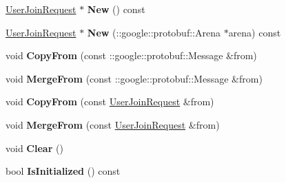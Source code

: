 \begin{DoxyCompactItemize}
\item 
\hypertarget{classSimpleChat_1_1UserJoinRequest_a0150a989e981f3fd7251433b40864a51}{\hyperlink{classSimpleChat_1_1UserJoinRequest}{User\-Join\-Request} $\ast$ {\bfseries New} () const }\label{classSimpleChat_1_1UserJoinRequest_a0150a989e981f3fd7251433b40864a51}

\item 
\hypertarget{classSimpleChat_1_1UserJoinRequest_abd14064bf5bfe987d71cb7ed385eed16}{\hyperlink{classSimpleChat_1_1UserJoinRequest}{User\-Join\-Request} $\ast$ {\bfseries New} (\-::google\-::protobuf\-::\-Arena $\ast$arena) const }\label{classSimpleChat_1_1UserJoinRequest_abd14064bf5bfe987d71cb7ed385eed16}

\item 
\hypertarget{classSimpleChat_1_1UserJoinRequest_a9d76ddfb6ab5b38ddbe0ba0d1b2ebf0f}{void {\bfseries Copy\-From} (const \-::google\-::protobuf\-::\-Message \&from)}\label{classSimpleChat_1_1UserJoinRequest_a9d76ddfb6ab5b38ddbe0ba0d1b2ebf0f}

\item 
\hypertarget{classSimpleChat_1_1UserJoinRequest_a012014877340a6159c67ae1ce9fd56ba}{void {\bfseries Merge\-From} (const \-::google\-::protobuf\-::\-Message \&from)}\label{classSimpleChat_1_1UserJoinRequest_a012014877340a6159c67ae1ce9fd56ba}

\item 
\hypertarget{classSimpleChat_1_1UserJoinRequest_aed9ca7e9ba259a3b11d7112f1495199d}{void {\bfseries Copy\-From} (const \hyperlink{classSimpleChat_1_1UserJoinRequest}{User\-Join\-Request} \&from)}\label{classSimpleChat_1_1UserJoinRequest_aed9ca7e9ba259a3b11d7112f1495199d}

\item 
\hypertarget{classSimpleChat_1_1UserJoinRequest_a3ca2c2b4215c09d18b20e80763003e58}{void {\bfseries Merge\-From} (const \hyperlink{classSimpleChat_1_1UserJoinRequest}{User\-Join\-Request} \&from)}\label{classSimpleChat_1_1UserJoinRequest_a3ca2c2b4215c09d18b20e80763003e58}

\item 
\hypertarget{classSimpleChat_1_1UserJoinRequest_ad76d8b89c423d79df14823769d8ecb3d}{void {\bfseries Clear} ()}\label{classSimpleChat_1_1UserJoinRequest_ad76d8b89c423d79df14823769d8ecb3d}

\item 
\hypertarget{classSimpleChat_1_1UserJoinRequest_a568cfe228f12edb638d41b6abcb29882}{bool {\bfseries Is\-Initialized} () const }\label{classSimpleChat_1_1UserJoinRequest_a568cfe228f12edb638d41b6abcb29882}


\end{DoxyCompactItemize}
